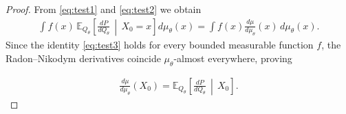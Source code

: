 \documentclass[10pt,a4paper]{amsart}
\begin{document}
\begin{proof}
From \eqref{eq:test1} and \eqref{eq:test2} we obtain
\begin{align}
\int
f(x)
\,
\mathbb E_{Q_\theta}
\left[
\frac{dP}{dQ_\theta}
\,\middle|\,
X_0=x
\right]
d\mu_\theta(x) = \int
f(x)
\frac{d\mu}{d\mu_\theta}(x)
\,d\mu_\theta(x) \label{eq:test3}.
\end{align}
Since the identity \eqref{eq:test3} holds for every bounded measurable function $f$, the
Radon--Nikodym derivatives coincide $\mu_\theta$-almost everywhere, proving

\begin{align}
\frac{d\mu}{d\mu_\theta}(X_0)
=
\mathbb E_{Q_\theta}
\left[
\frac{dP}{dQ_\theta}
\,\middle|\,
X_0
\right].
\end{align}

\end{proof}
\end{document}
